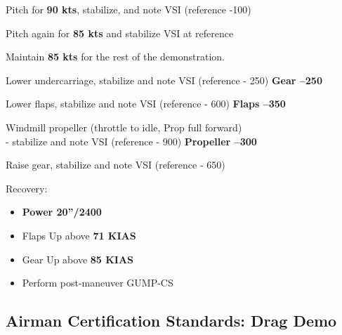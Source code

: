 Pitch for \textbf{90 kts}, stabilize, and note VSI (reference -100)

Pitch again for \textbf{85 kts} and stabilize VSI at reference

Maintain \textbf{85 kts} for the rest of the demonstration.

Lower undercarriage, stabilize and note VSI (reference - 250) \textbf{Gear –250}

Lower flaps, stabilize and note VSI (reference - 600) \textbf{Flaps –350}

Windmill propeller (throttle to idle, Prop full forward)\\
- stabilize and note VSI (reference - 900) \textbf{Propeller –300}

Raise gear, stabilize and note VSI (reference - 650)

Recovery:
\begin{itemize}[label={}]

\item \textbf{Power 20''/2400}
\item Flaps Up above \textbf{71 KIAS}
\item Gear Up above \textbf{85 KIAS}
\item Perform post-maneuver GUMP-CS
\end{itemize}

\subsection{Airman Certification Standards: Drag Demo}


